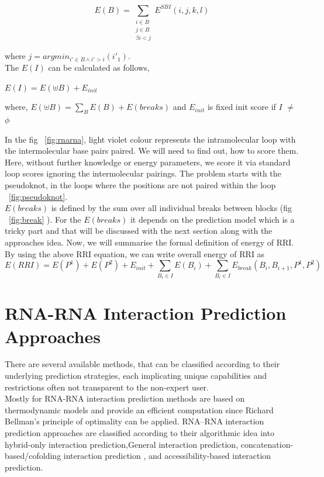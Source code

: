\documentclass[twoside,a4paper]{report}
\begin{document}
	\begin{equation*}
	E(B) =  \sum_{\substack{i \in B \\ j \in B \\ \exists i < j}}E^{SBI}(i,j,k,l)
	\end{equation*}	
	
	where $j = argmin_{i' \in B \wedge i'>i}(i'_1)$. \\
	
		The $E(I)$ can be calculated as follows,
	
	\begin{center}
		$E(I) = E(  \uplus  B) + E_{init} $
	\end{center}
	\begin{center}
		where, $E(  \uplus  B) = \sum_B E(B) + E(breaks)$ and $E_{init}$ is fixed init score if $I$ $\neq$ $\phi$ 
	\end{center}

	In the fig ~\ref{fig:rnarna}, light violet colour represents the intramolecular loop with the intermolecular base pairs paired. We will need to find out, how to score them. Here, without further knowledge or energy parameters, we score it via standard loop scores ignoring the intermolecular pairings. The problem starts with the pseudoknot, in the loops where the positions are not paired within the loop ~\ref{fig:pseudoknot}.\\

	$E(breaks)$ is defined by the sum over all individual breaks between blocks (fig  ~\ref{fig:break} ). For the $E(breaks)$ it depends on the prediction model which is a tricky part and that will be discussed with the next section along with the approaches idea. Now, we will summarise the formal definition of energy of RRI. By using the above RRI equation, we can write overall energy of RRI as \\
	
	\begin{equation}
	\label{eq:rri}
	E(RRI) = E(P^1)+E(P^2)+E_{init}+ \sum_{B_i \in I}E(B_i) + \sum_{B_i \in I} E_{break} (B_i,B_{i+1}, P^1, P^2)
	\end{equation}
	
	
	\section{RNA-RNA Interaction Prediction Approaches}
	There are several available methods, that can be classified according to their underlying prediction strategies, each implicating unique capabilities and restrictions often not transparent to the non-expert user.\\ 
	Mostly for RNA-RNA interaction prediction methods are based on thermodynamic models and provide an efficient computation since Richard Bellman’s principle of optimality \citep{raden2018interactive} can be applied. RNA–RNA interaction prediction approaches are classified according to their algorithmic idea into hybrid-only interaction prediction,General interaction prediction, concatenation-based/cofolding interaction prediction , and accessibility-based interaction prediction. \\
	
\end{document}
